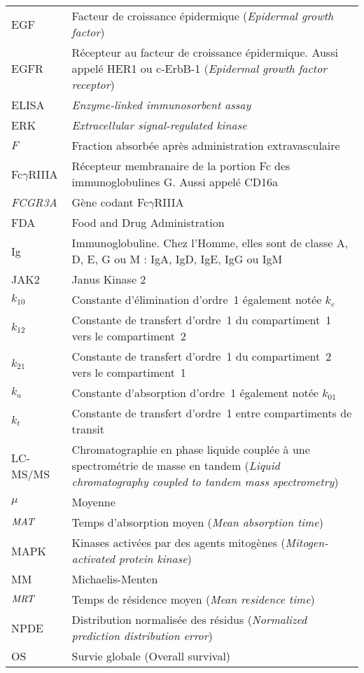 \begin{tabularx}{30em}{X X}
EGF & 	Facteur de croissance épidermique (\textit{Epidermal growth factor})\\
EGFR & 	Récepteur au facteur de croissance épidermique. Aussi appelé HER1 ou c-ErbB-1 (\textit{Epidermal growth factor receptor})\\
ELISA & 	\textit{Enzyme-linked immunosorbent assay}\\
ERK & 	\textit{Extracellular signal-regulated kinase}\\
$F$ & 	Fraction absorbée après administration extravasculaire\\
Fc$\gamma$RIIIA & 	Récepteur membranaire de la portion Fc des immunoglobulines G. Aussi appelé CD16a\\
\textit{FCGR3A} & 	Gène codant Fc$\gamma$RIIIA\\
FDA & 	Food and Drug Administration\\
Ig & 	Immunoglobuline. Chez l'Homme, elles sont de classe A, D, E, G ou M : IgA, IgD, IgE, IgG ou IgM \\
JAK2 & 	Janus Kinase 2\\
$k_{10}$ & 	Constante d'élimination d'ordre~1 également notée $k_e$\\
$k_{12}$ & 	Constante de transfert d'ordre~1 du compartiment~1 vers le compartiment~2\\
$k_{21}$ & 	Constante de transfert d'ordre~1 du compartiment~2 vers le compartiment~1\\
$k_a$ & 	Constante d'absorption d'ordre~1 également notée $k_{01}$\\
$k_t$ & 	Constante de transfert d'ordre~1 entre compartiments de transit\\
LC-MS/MS & 	Chromatographie en phase liquide couplée à une spectrométrie de masse en tandem (\textit{Liquid chromatography coupled to tandem mass spectrometry})\\
$\mu$ & 	Moyenne\\
$\operatorname{\textit{MAT}}$ & 	Temps d'absorption moyen (\textit{Mean absorption time})\\
MAPK & 	Kinases activées par des agents mitogènes (\textit{Mitogen-activated protein kinase})\\
MM & 	Michaelis-Menten\\
$\operatorname{\textit{MRT}}$ & 	Temps de résidence moyen (\textit{Mean residence time})\\
NPDE & 	Distribution normalisée des résidus (\textit{Normalized prediction distribution error})\\
OS & 	Survie globale (Overall survival)\\

\end{tabularx}
